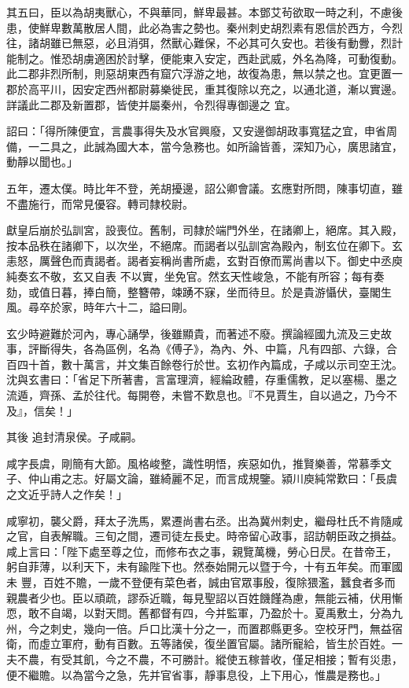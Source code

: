 \begin{pinyinscope}
 其五曰，臣以為胡夷獸心，不與華同，鮮卑最甚。本鄧艾茍欲取一時之利，不慮後患，使鮮卑數萬散居人間，此必為害之勢也。秦州刺史胡烈素有恩信於西方，今烈往，諸胡雖已無惡，必且消弭，然獸心難保，不必其可久安也。若後有動釁，烈計能制之。惟恐胡虜適困於討擊，便能東入安定，西赴武威，外名為降，可動復動。此二郡非烈所制，則惡胡東西有窟穴浮游之地，故復為患，無以禁之也。宜更置一郡於高平川，因安定西州都尉募樂徙民，重其復除以充之，以通北道，漸以實邊。詳議此二郡及新置郡，皆使并屬秦州，令烈得專御邊之
 宜。



 詔曰：「得所陳便宜，言農事得失及水官興廢，又安邊御胡政事寬猛之宜，申省周備，一二具之，此誠為國大本，當今急務也。如所論皆善，深知乃心，廣思諸宜，動靜以聞也。」



 五年，遷太僕。時比年不登，羌胡擾邊，詔公卿會議。玄應對所問，陳事切直，雖不盡施行，而常見優容。轉司隸校尉。



 獻皇后崩於弘訓宮，設喪位。舊制，司隸於端門外坐，在諸卿上，絕席。其入殿，按本品秩在諸卿下，以次坐，不絕席。而謁者以弘訓宮為殿內，制玄位在卿下。玄恚怒，厲聲色而責謁者。謁者妄稱尚書所處，玄對百僚而罵尚書以下。御史中丞庾純奏玄不敬，玄又自表
 不以實，坐免官。然玄天性峻急，不能有所容；每有奏劾，或值日暮，捧白簡，整簪帶，竦踴不寐，坐而待旦。於是貴游懾伏，臺閣生風。尋卒於家，時年六十二，謚曰剛。



 玄少時避難於河內，專心誦學，後雖顯貴，而著述不廢。撰論經國九流及三史故事，評斷得失，各為區例，名為《傅子》，為內、外、中篇，凡有四部、六錄，合百四十首，數十萬言，并文集百餘卷行於世。玄初作內篇成，子咸以示司空王沈。沈與玄書曰：「省足下所著書，言富理濟，經綸政體，存重儒教，足以塞楊、墨之流遁，齊孫、孟於往代。每開卷，未嘗不歎息也。『不見賈生，自以過之，乃今不及』，信矣！」



 其後
 追封清泉侯。子咸嗣。



 咸字長虞，剛簡有大節。風格峻整，識性明悟，疾惡如仇，推賢樂善，常慕季文子、仲山甫之志。好屬文論，雖綺麗不足，而言成規鑒。潁川庾純常歎曰：「長虞之文近乎詩人之作矣！」



 咸寧初，襲父爵，拜太子洗馬，累遷尚書右丞。出為冀州刺史，繼母杜氏不肯隨咸之官，自表解職。三旬之間，遷司徒左長史。時帝留心政事，詔訪朝臣政之損益。咸上言曰：「陛下處至尊之位，而修布衣之事，親覽萬機，勞心日昃。在昔帝王，躬自菲薄，以利天下，未有踰陛下也。然泰始開元以暨于今，十有五年矣。而軍國未
 豐，百姓不贍，一歲不登便有菜色者，誠由官眾事殷，復除猥濫，蠶食者多而親農者少也。臣以頑疏，謬忝近職，每見聖詔以百姓饑饉為慮，無能云補，伏用慚恧，敢不自竭，以對天問。舊都督有四，今并監軍，乃盈於十。夏禹敷土，分為九州，今之刺史，幾向一倍。戶口比漢十分之一，而置郡縣更多。空校牙門，無益宿衛，而虛立軍府，動有百數。五等諸侯，復坐置官屬。諸所寵給，皆生於百姓。一夫不農，有受其飢，今之不農，不可勝計。縱使五稼普收，僅足相接；暫有災患，便不繼贍。以為當今之急，先并官省事，靜事息役，上下用心，惟農是務也。」




\end{pinyinscope}
